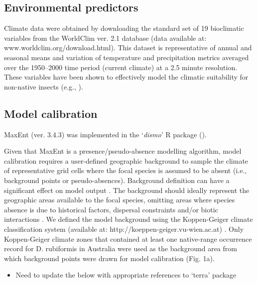 \documentclass[
  authoryear,
  preprint,
  3p,
  onecolumn]{elsarticle}
\providecommand{\tightlist}{%
  \setlength{\itemsep}{0pt}\setlength{\parskip}{0pt}}\usepackage{longtable,booktabs,array}
\begin{document}
\hypertarget{environmental-predictors}{%
\subsection{Environmental predictors}\label{environmental-predictors}}

Climate data were obtained by downloading the standard set of 19
bioclimatic variables from the WorldClim ver. 2.1 database
\citep{Fick2017} (data available at: www.worldclim.org/download.html).
This dataset is representative of annual and seasonal means and
variation of temperature and precipitation metrics averaged over the
1950--2000 time period (current climate) at a 2.5 minute resolution.
These variables have been shown to effectively model the climatic
suitability for non-native insects (e.g., \citet{Sutton2022}).

\hypertarget{model-calibration}{%
\subsection{Model calibration}\label{model-calibration}}

MaxEnt (ver. 3.4.3) was implemented in the `\emph{dismo}' R package
(\citet{Hijmans2017}).

Given that MaxEnt is a presence/pseudo-absence modelling algorithm,
model calibration requires a user-defined geographic background to
sample the climate of representative grid cells where the focal species
is assumed to be absent (i.e., background points or pseudo-absences).
Background definition can have a significant effect on model output
\citep{VanDerWal2009}. The background should ideally represent the
geographic areas available to the focal species, omitting areas where
species absence is due to historical factors, dispersal constraints
and/or biotic interactions \citep{Sanin2018}. We defined the model
background using the Koppen-Geiger climate classification system
(available at: http://koeppen-geiger.vu-wien.ac.at) \citep{Webber2011}.
Only Koppen-Geiger climate zones that contained at least one
native-range occurrence record for D. rubiformis in Australia were used
as the background area from which background points were drawn for model
calibration (Fig. 1a).

\begin{itemize}
\tightlist
\item
  Need to update the below with appropriate references to `terra'
  package
\end{itemize}
\end{document}

